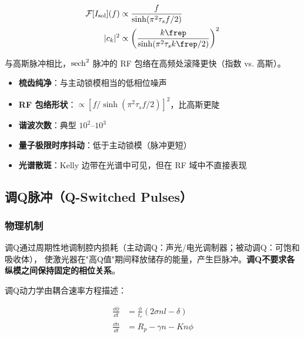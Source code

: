\documentclass[11pt,a4paper]{article}
\newcommand{\FT}{\mathcal{F}}
\begin{document}
\begin{equation}\label{eq:soliton_rf}
\begin{aligned}
\FT[I_{\text{sol}}](f) &\propto \frac{f}{\sinh(\pi^2 \tau_s f/2)} \\
|c_k|^2 &\propto \left( \frac{k\frep}{\sinh(\pi^2 \tau_s k\frep/2)} \right)^2
\end{aligned}
\end{equation}

与高斯脉冲相比，$\sech^2$ 脉冲的 RF 包络在高频处滚降更快（指数 vs. 高斯）。

\begin{tcolorbox}[width=0.95\textwidth, colback=orange!5, colframe=orange!50, title=孤子锁模 RF 特征总结]
\begin{itemize}
    \item \textbf{梳齿纯净}：与主动锁模相当的低相位噪声
    \item \textbf{RF 包络形状}：$\propto [f/\sinh(\pi^2 \tau_s f/2)]^2$，比高斯更陡
    \item \textbf{谐波次数}：典型 $10^2$--$10^3$
    \item \textbf{量子极限时序抖动}：低于主动锁模（脉冲更短）
    \item \textbf{光谱散斑}：Kelly 边带在光谱中可见，但在 RF 域中不直接表现
\end{itemize}
\end{tcolorbox}

\subsection{调Q脉冲（Q-Switched Pulses）}

\subsubsection{物理机制}

调Q通过周期性地调制腔内损耗（主动调Q：声光/电光调制器；被动调Q：可饱和吸收体），
使激光器在"高Q值"期间释放储存的能量，产生巨脉冲。\textbf{调Q不要求各纵模之间保持固定的相位关系}。

调Q动力学由耦合速率方程描述\cite{Siegman1986}：

\begin{equation}\label{eq:qswitch_rate}
\begin{aligned}
\frac{\dd{\phi}}{\dd{t}} &= \frac{\phi}{t_r} (2\sigma n l - \delta) \\
\frac{\dd{n}}{\dd{t}} &= R_p - \gamma n - K n \phi
\end{aligned}
\end{equation}
\end{document}
